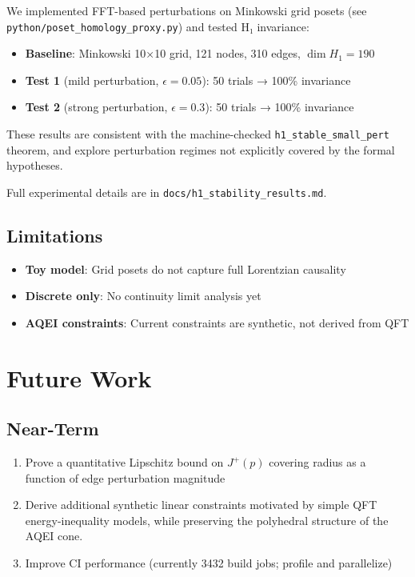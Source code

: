 \documentclass[12pt]{article}
\begin{document}
We implemented FFT-based perturbations on Minkowski grid posets (see \texttt{python/poset\_homology\_proxy.py}) and tested H₁ invariance:

\begin{itemize}
    \item \textbf{Baseline}: Minkowski 10×10 grid, 121 nodes, 310 edges, $\dim H_1 = 190$
    \item \textbf{Test 1} (mild perturbation, $\epsilon=0.05$): 50 trials → 100\% invariance
    \item \textbf{Test 2} (strong perturbation, $\epsilon=0.3$): 50 trials → 100\% invariance
\end{itemize}

These results are consistent with the machine-checked \texttt{h1\_stable\_small\_pert} theorem, and explore perturbation regimes not explicitly covered by the formal hypotheses.

Full experimental details are in \texttt{docs/h1\_stability\_results.md}.

\subsection{Limitations}

\begin{itemize}
    \item \textbf{Toy model}: Grid posets do not capture full Lorentzian causality
    \item \textbf{Discrete only}: No continuity limit analysis yet
    \item \textbf{AQEI constraints}: Current constraints are synthetic, not derived from QFT
\end{itemize}

\section{Future Work}

\subsection{Near-Term}

\begin{enumerate}
    \item Prove a quantitative Lipschitz bound on $J^+(p)$ covering radius as a function of edge perturbation magnitude
    \item Derive additional synthetic linear constraints motivated by simple QFT
          energy-inequality models, while preserving the polyhedral structure of
          the AQEI cone.
    \item Improve CI performance (currently 3432 build jobs; profile and parallelize)
\end{enumerate}
\end{document}
